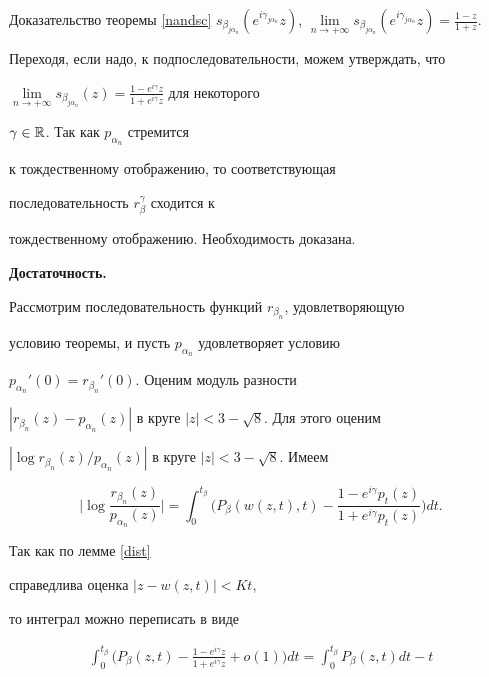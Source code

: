 \begin{pf*}{Доказательство теоремы \ref{nandsc}}
$s_{\beta_{j\alpha_n}}(e^{i\gamma_{j\alpha_n}}z)$, $\lim\limits_{n\to+\infty}


s_{\beta_{j\alpha_n}}(e^{i\gamma_{j\alpha_n}}z)=\frac{1-z}{1+z}$. 


Переходя, если надо, к подпоследовательности, можем утверждать, что


$\lim\limits_{n\to+\infty}s_{\beta_{j\alpha_n}}(z)=


\frac{1-e^{i\gamma}z}{1+e^{i\gamma}z}$ для некоторого


$\gamma\in\Bbb R$. Так как $p_{\alpha_n}$ стремится 


к тождественному отображению, то соответствующая 


последовательность $r_{\beta}^{\gamma}$ сходится к


тождественному отображению. Необходимость доказана.


\smallskip





{\bf Достаточность.}


Рассмотрим последовательность функций $r_{\beta_n}$, удовлетворяющую


условию теоремы, и пусть $p_{\alpha_n}$ удовлетворяет условию


$p_{\alpha_n}'(0)=r_{\beta_n}'(0)$. Оценим модуль разности


$|r_{\beta_n}(z)-p_{\alpha_n}(z)|$ в круге $|z|<3-\sqrt{8}$. Для этого оценим


$|\log{r_{\beta_n}(z)}/{p_{\alpha_n}(z)}|$ в круге $|z|<3-\sqrt{8}$. Имеем


$$


\bigg|\log\frac{r_{\beta_n}(z)}{p_{\alpha_n}(z)}\bigg|=


\int_0^{t_\beta}\bigg(P_\beta(w(z,t),t)-


\frac{1-e^{i\gamma}p_t(z)}{1+e^{i\gamma}p_t(z)}\bigg)dt.


$$


Так как по лемме \ref{dist} %


справедлива оценка $|z-w(z,t)|<K t$, 


то интеграл можно переписать в виде


\begin{multline*}


\int_0^{t_\beta}\bigg(P_\beta(z,t)-


\frac{1-e^{i\gamma}z}{1+e^{i\gamma}z}+o(1)\bigg)dt=


\int_0^{t_\beta}P_\beta(z,t)dt-t



\end{multline*}
\end{pf*}
